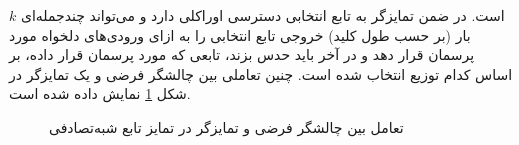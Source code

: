 $k$
است. در ضمن تمایزگر به تابع انتخابی دسترسی اوراکلی دارد و می‌تواند چندجمله‌ای بار  (بر حسب طول کلید) خروجی تابع انتخابی  را به ازای ورودی‌های دلخواه مورد پرسمان
قرار دهد و در آخر باید حدس بزند، تابعی که مورد پرسمان قرار داده، بر اساس کدام توزیع انتخاب  شده است.  چنین تعاملی بین چالشگر فرضی و یک تمایزگر در شکل 
 \ref{fig:prfintraction}
 نمایش داده شده است.
\begin{figure}
	
\begin{center}

\end{center}
\caption{تعامل بین چالشگر فرضی و تمایزگر در تمایز تابع شبه‌تصادفی}
\label{fig:prfintraction}
\end{figure}

